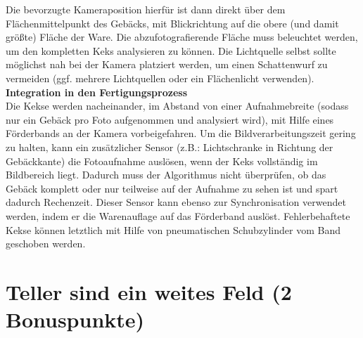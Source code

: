 \documentclass{ezb}
\begin{document}
\newline
Die bevorzugte Kameraposition hierfür ist dann direkt über dem Flächenmittelpunkt des Gebäcks, mit  Blickrichtung auf die obere (und damit größte) Fläche der Ware. Die abzufotografierende Fläche muss beleuchtet werden, um den kompletten Keks analysieren zu können. Die Lichtquelle selbst sollte möglichst nah bei der Kamera platziert werden, um einen Schattenwurf zu vermeiden (ggf. mehrere Lichtquellen oder ein Flächenlicht verwenden). \\ 
\newline
\textbf{{\large Integration in den Fertigungsprozess}}\\
\newline
Die Kekse werden nacheinander, im Abstand von einer Aufnahmebreite (sodass nur ein Gebäck pro Foto aufgenommen und analysiert wird), mit Hilfe eines Förderbands an der Kamera vorbeigefahren. Um die Bildverarbeitungszeit gering zu halten, kann ein zusätzlicher Sensor (z.B.: Lichtschranke in Richtung der Gebäckkante) die Fotoaufnahme auslösen, wenn der Keks vollständig im Bildbereich liegt. Dadurch muss der Algorithmus nicht überprüfen, ob das Gebäck komplett oder nur teilweise auf der Aufnahme zu sehen ist und spart dadurch Rechenzeit. Dieser Sensor kann ebenso zur Synchronisation verwendet werden, indem er die Warenauflage auf das Förderband auslöst. Fehlerbehaftete Kekse können letztlich mit Hilfe von pneumatischen Schubzylinder vom Band geschoben werden.
\newpage
\section{Teller sind ein weites Feld (2 Bonuspunkte)}
\end{document}

